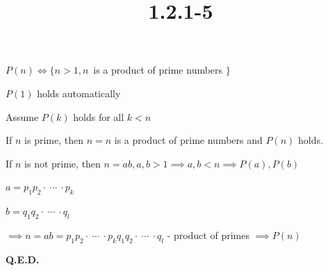 \documentclass{article}
\title{1.2.1-5}
\begin{document}
\maketitle

\( P(n) \iff \{ n > 1, n\, \) is a product of prime numbers \( \} \)

\( P(1) \) holds automatically

Assume \( P(k) \) holds for all \( k < n \)

If \( n \) is prime, then \( n = n \) is a product of prime numbers and \( P(n) \) holds.

If \( n \) is not prime, then \( n = ab, a, b > 1 \implies a, b < n \implies P(a), P(b) \)

\( a = p_1p_2 \cdot\ \cdots\ \cdot p_k \)

\( b = q_1q_2 \cdot\ \cdots\ \cdot q_l \)

\( \implies n = ab = p_1p_2 \cdot\ \cdots\ \cdot p_k q_1q_2 \cdot\ \cdots\ \cdot q_l \) - product of primes \( \implies P(n) \)

\textbf{Q.E.D.}
\end{document}
